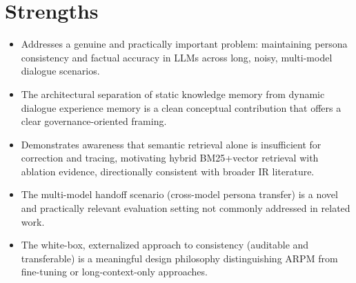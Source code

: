\documentclass[11pt]{article}
\begin{document}
\section*{Strengths}
\begin{itemize}[leftmargin=*]
  \item Addresses a genuine and practically important problem: maintaining persona consistency and factual accuracy in LLMs across long, noisy, multi-model dialogue scenarios.
  \item The architectural separation of static knowledge memory from dynamic dialogue experience memory is a clean conceptual contribution that offers a clear governance-oriented framing.
  \item Demonstrates awareness that semantic retrieval alone is insufficient for correction and tracing, motivating hybrid BM25+vector retrieval with ablation evidence, directionally consistent with broader IR literature.
  \item The multi-model handoff scenario (cross-model persona transfer) is a novel and practically relevant evaluation setting not commonly addressed in related work.
  \item The white-box, externalized approach to consistency (auditable and transferable) is a meaningful design philosophy distinguishing ARPM from fine-tuning or long-context-only approaches.
\end{itemize}
\end{document}
